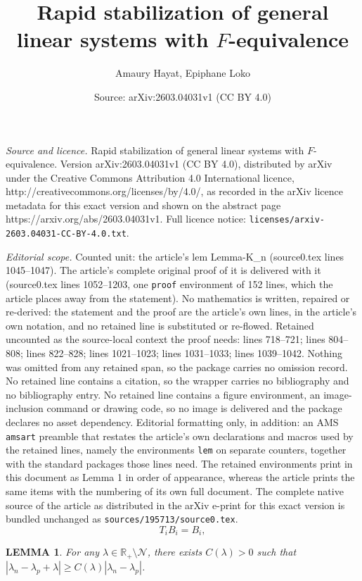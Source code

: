 \documentclass[10pt,a4paper]{amsart}
\title{Rapid stabilization of general linear systems with $F$-equivalence}
\author{Amaury Hayat, Epiphane Loko}
\date{Source: arXiv:2603.04031v1 (CC BY 4.0)}
\newtheorem{lem}{LEMMA}
\begin{document}
\maketitle

\noindent\emph{Source and licence.} Rapid stabilization of general linear systems with $F$-equivalence. Version arXiv:2603.04031v1 (CC BY 4.0), distributed by arXiv under the Creative Commons Attribution 4.0 International licence, http://creativecommons.org/licenses/by/4.0/, as recorded in the arXiv licence metadata for this exact version and shown on the abstract page https://arxiv.org/abs/2603.04031v1. Full licence notice: \texttt{licenses/arxiv-2603.04031-CC-BY-4.0.txt}.\par\smallskip

\noindent\textit{Editorial scope.} Counted unit: the article's lem Lemma-K\_n (source0.tex lines 1045--1047). The article's complete original proof of it is delivered with it (source0.tex lines 1052--1203, one \texttt{proof} environment of 152 lines, which the article places away from the statement). No mathematics is written, repaired or re-derived: the statement and the proof are the article's own lines, in the article's own notation, and no retained line is substituted or re-flowed.  Retained uncounted as the source-local context the proof needs: lines 718--721; lines 804--808; lines 822--828; lines 1021--1023; lines 1031--1033; lines 1039--1042.  Nothing was omitted from any retained span, so the package carries no omission record.  No retained line contains a citation, so the wrapper carries no bibliography and no bibliography entry.  No retained line contains a figure environment, an image-inclusion command or drawing code, so no image is delivered and the package declares no asset dependency.  Editorial formatting only, in addition: an AMS \texttt{amsart} preamble that restates the article's own declarations and macros used by the retained lines, namely the environments \texttt{lem} on separate counters, together with the standard packages those lines need.  The retained environments print in this document as Lemma 1 in order of appearance, whereas the article prints the same items with the numbering of its own full document.  The complete native source of the article as distributed in the arXiv e-print for this exact version is bundled unchanged as \texttt{sources/195713/source0.tex}.
\begin{equation}
\label{eq:tbb}
    T_iB_{i}= B_{i},
\end{equation}

\begin{lem}
\label{lem:lambda}
    For any $\lambda\in\mathbb{R}_{+}\setminus\mathcal{N}$, there exists $C(\lambda)>0$ such that 
    $|\lambda_n-\lambda_p+\lambda|\geq C(\lambda)|\lambda_n-\lambda_p|$.
\end{lem}
\end{document}
